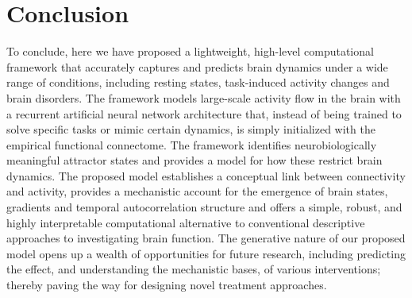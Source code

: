 \documentclass{article}
\begin{document}
\section{Conclusion}

To conclude, here we have proposed a lightweight, high-level computational framework that accurately captures and predicts brain dynamics under a wide range of conditions, including resting states, task-induced activity changes and brain disorders. The framework models large-scale activity flow in the brain with a recurrent artificial neural network architecture that, instead of being trained to solve specific tasks or mimic certain dynamics, is simply initialized with the empirical functional connectome. The framework identifies neurobiologically meaningful attractor states and provides a model for how these restrict brain dynamics.
The proposed model establishes a conceptual link between connectivity and activity, provides a mechanistic account for the emergence of brain states, gradients and temporal autocorrelation structure and offers a simple, robust, and highly interpretable computational alternative to conventional descriptive approaches to investigating brain function. The generative nature of our proposed model opens up a wealth of opportunities for future research, including predicting the effect, and understanding the mechanistic bases, of various interventions; thereby paving the way for designing novel treatment approaches.
\printglossaries






\end{document}
